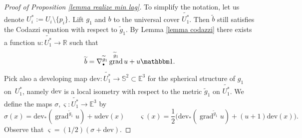 \documentclass[JEP,XML,SOM,Unicode,NoEqCountersInSection,published]{cedram}
\newcommand{\sbullet}{{\scriptscriptstyle\bullet}}
\theoremstyle{definition}
\newcommand{\R}{{\mathbb R}}
\newcommand{\E}{\mathbb{E}}
\newcommand{\dev}{\mathrm{dev}}
\DeclareMathOperator{\grad}{grad}
\begin{document}
\begin{proof}[Proof of Proposition \ref{lemma realize min lag}]
To simplify the notation, let us denote $U_i^*:=U_i\setminus\{p_i\}$.
Lift $g_1$ and $b$ to the universal cover $\widetilde{U_1^*}$. Then $\widetilde b$ still satisfies the Codazzi equation with respect to $\widetilde g_1$. By Lemma \ref{lemma codazzi} there exists a function $u:\widetilde {U_1^*}\to\R$ such that
\[
\widetilde b=\nabla^{\widetilde g_1}_\sbullet\grad^{\widetilde g_1} u+u\mathbbm 1.
\]
Pick also a developing map $\dev:\widetilde {U_1^*}\to\mathbb S^2\subset\E^3$ for the spherical structure of $g_1$ on~$U_1^*$, namely $\dev$ is a local isometry with respect to the metric $\widetilde g_1$ on $\widetilde {U_1^*}$. We define the maps $\sigma,\varsigma:\widetilde {U_1^*}\to\E^3$ by
\[
\sigma(x)=\dev_*(\grad^{\widetilde g_1}u)+u\dev(x) \qquad \varsigma(x)=\frac{1}{2}\bigl(\dev_*(\grad^{\widetilde g_1}u)+(u+1)\dev(x) \bigr).
\]
Observe that $\varsigma=(1/2)(\sigma+\dev)$.


\end{proof}
\end{document}

